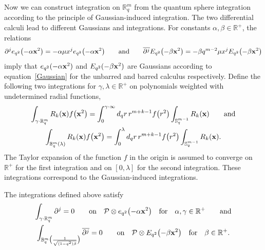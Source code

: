 \documentclass[pdftex]{sigma}
\newcommand{\mR}{\mathbb{R}}
\newcommand{\mS}{\mathbb{S}}
\newcommand{\mB}{\mathbb{B}}
\newcommand{\cP}{\mathcal{P}}
\numberwithin{equation}{section}
\begin{document}
Now we can construct integration on $\mR^m_q$ from the quantum sphere integration according to the principle of Gaussian-induced integration. The two dif\/ferential calculi lead to dif\/ferent Gaussians and integrations. For constants $\alpha,\beta\in\mR^+$, the relations
\begin{gather*}
\partial^je_{q^2}\big({-}\alpha\bold{x}^2\big)=-\alpha\mu x^je_{q^2}\big({-}\alpha\bold{x}^2\big)\qquad \mbox{and}\qquad \overline{\partial^j} E_{q^2}\big({-}\beta\bold{x}^2\big)=-\beta q^{m-2}\mu x^jE_{q^2}\big({-}\beta\bold{x}^2\big)
\end{gather*}
imply that $e_{q^2}(-\alpha\bold{x}^2)$ and $E_{q^2}(-\beta\bold{x}^2)$ are Gaussians according to equation~\eqref{Gaussian} for the unbarred and barred calculus respectively. Def\/ine the following two integrations for $\gamma,\lambda\in\mR^+$ on polynomials weighted with undetermined radial functions,
\begin{gather*}
\int_{\gamma\cdot\mR^m_q}R_{k}(\bold{x})f\big(\bold{x}^2\big) = \int_0^{\gamma\cdot\infty}d_qr\,r^{m+k-1}f\big(r^2\big)\int_{\mS^{m-1}_q}R_{k}(\bold{x})\qquad \mbox{and}\\
\int_{\mB^m_q(\lambda)}R_{k}(\bold{x})f\big(\bold{x}^2\big) = \int_0^{\lambda}d_qr\,r^{m+k-1}f\big(r^2\big)\int_{\mS^{m-1}_q}R_{k}(\bold{x}).
\end{gather*}
The Taylor expansion of the function $f$ in the origin is assumed to converge on $\mR^+$ for the f\/irst integration and on $[0,\lambda]$ for the second integration. These integrations correspond to the Gaussian-induced integrations.
\begin{theorem}
\label{2indint}
The integrations defined above satisfy
\begin{gather*}
\int_{\gamma\cdot\mR^m_q}\partial^j=0 \qquad \mbox{on}\quad  \cP\otimes e_{q^2}\big({-}\alpha\bold{x}^2\big)\quad \mbox{for}\quad \alpha,\gamma\in\mR^+\qquad\mbox{and}\\
\int_{\mB^m_q\big(\frac{1}{\sqrt{(1-q^2)\beta}}\big)}\overline{\partial^j}=0\qquad \mbox{on}\quad \cP\otimes E_{q^2}\big({-}\beta\bold{x}^2\big)\quad\mbox{for}\quad\beta\in\mR^+.
\end{gather*}
\end{theorem}
\end{document}

